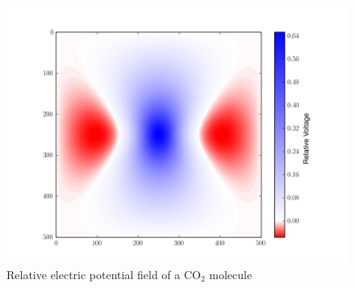 \begin{figure}
\centering
\includegraphics[width=12cm]{co2V.png}
\caption{Relative electric potential field of a CO$_2$ molecule}
\end{figure}
